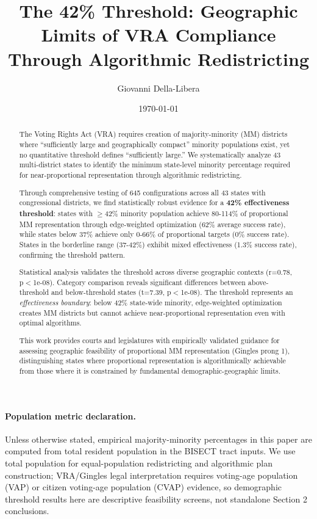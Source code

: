 \documentclass[12pt]{article}
\title{The 42\% Threshold: Geographic Limits of VRA Compliance Through Algorithmic Redistricting}
\author{Giovanni Della-Libera}
\date{\today}
\begin{document}
\maketitle

\begin{abstract}
The Voting Rights Act (VRA) requires creation of majority-minority (MM) districts where ``sufficiently large and geographically compact'' minority populations exist, yet no quantitative threshold defines ``sufficiently large.'' We systematically analyze 43 multi-district states to identify the minimum state-level minority percentage required for near-proportional representation through algorithmic redistricting.

Through comprehensive testing of 645 configurations across all 43 states with congressional districts, we find statistically robust evidence for a \textbf{42\% effectiveness threshold}: states with $\geq$42\% minority population achieve 80-114\% of proportional MM representation through edge-weighted optimization (62\% average success rate), while states below 37\% achieve only 0-66\% of proportional targets (0\% success rate). States in the borderline range (37-42\%) exhibit mixed effectiveness (1.3\% success rate), confirming the threshold pattern.

Statistical analysis validates the threshold across diverse geographic contexts (r=0.78, p$<$1e-08). Category comparison reveals significant differences between above-threshold and below-threshold states (t=7.39, p$<$1e-08). The threshold represents an \textit{effectiveness boundary}: below 42\% state-wide minority, edge-weighted optimization creates MM districts but cannot achieve near-proportional representation even with optimal algorithms.

This work provides courts and legislatures with empirically validated guidance for assessing geographic feasibility of proportional MM representation (Gingles prong 1), distinguishing states where proportional representation is algorithmically achievable from those where it is constrained by fundamental demographic-geographic limits.
\end{abstract}

\paragraph{Population metric declaration.} Unless otherwise stated, empirical majority-minority percentages in this paper are computed from total resident population in the BISECT tract inputs. We use total population for equal-population redistricting and algorithmic plan construction; VRA/Gingles legal interpretation requires voting-age population (VAP) or citizen voting-age population (CVAP) evidence, so demographic threshold results here are descriptive feasibility screens, not standalone Section 2 conclusions.
\end{document}
